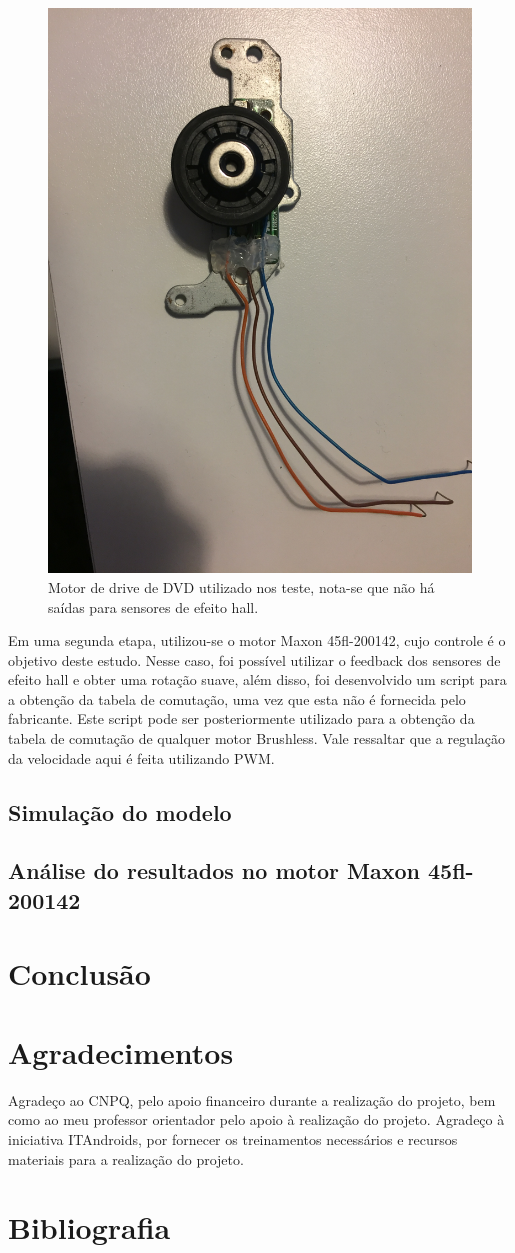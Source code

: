 \documentclass[a4paper,11pt]{article}
\begin{document}
		\begin{figure}[ht]
			\centering
			\includegraphics[width=0.5\linewidth]{images/motorantigo}
			\caption{Motor de drive de DVD utilizado nos teste, nota-se que não há saídas para sensores de efeito hall.}
			\label{fig:motorantigo}
		\end{figure}
	
		\newpage
		
		Em uma segunda etapa, utilizou-se o motor Maxon 45fl-200142, cujo controle é o objetivo deste estudo. Nesse caso, foi possível utilizar o feedback dos sensores de efeito hall e obter uma rotação suave, além disso, foi desenvolvido um script para a obtenção da tabela de comutação, uma vez que esta não é fornecida pelo fabricante. Este script pode ser posteriormente utilizado para a obtenção da tabela de comutação de qualquer motor Brushless. Vale ressaltar que a regulação da velocidade aqui é feita utilizando PWM.
		
		
		\subsection{Simulação do modelo}
		
		\subsection{Análise do resultados no motor Maxon 45fl-200142}
	\section{Conclusão}
	
	\section{Agradecimentos}
	Agradeço ao CNPQ, pelo apoio financeiro durante a realização do projeto, bem como ao meu professor orientador pelo apoio à realização do projeto. Agradeço à iniciativa ITAndroids, por fornecer os treinamentos necessários e recursos materiais para a realização do projeto.
	
	\section{Bibliografia}
	\printbibliography[heading=none]
	
\end{document}
